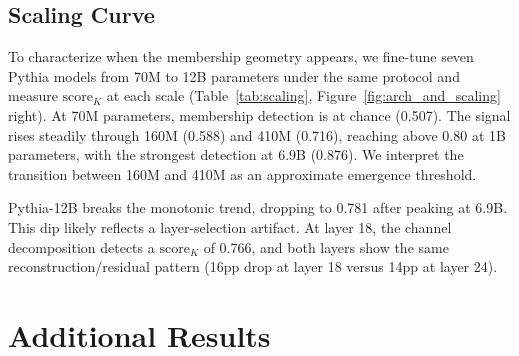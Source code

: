 \subsection{Scaling Curve}
\label{app:scaling}

\begin{table}[!htbp]
\centering
\caption{Scaling curve of membership detection across seven Pythia model sizes.
All models are fine-tuned under the same protocol on the same data.
$\mathrm{score}_K$ measures AUROC for projection onto the knowledge direction $\dK$.
Membership geometry is absent at 70M parameters and emerges above approximately 400M parameters (Figure~\ref{fig:arch_and_scaling}, right).}
\label{tab:scaling}
\end{table}

To characterize when the membership geometry appears, we fine-tune seven Pythia models from 70M to 12B parameters under the same protocol and measure $\mathrm{score}_K$ at each scale (Table~\ref{tab:scaling}, Figure~\ref{fig:arch_and_scaling} right).
At 70M parameters, membership detection is at chance (0.507).
The signal rises steadily through 160M (0.588) and 410M (0.716), reaching above 0.80 at 1B parameters, with the strongest detection at 6.9B (0.876).
We interpret the transition between 160M and 410M as an approximate emergence threshold.

Pythia-12B breaks the monotonic trend, dropping to 0.781 after peaking at 6.9B.
This dip likely reflects a layer-selection artifact. At layer 18, the channel decomposition detects a $\mathrm{score}_K$ of 0.766, and both layers show the same reconstruction/residual pattern (16pp drop at layer 18 versus 14pp at layer 24).

\FloatBarrier

\section{Additional Results}
\label{app:additional}

